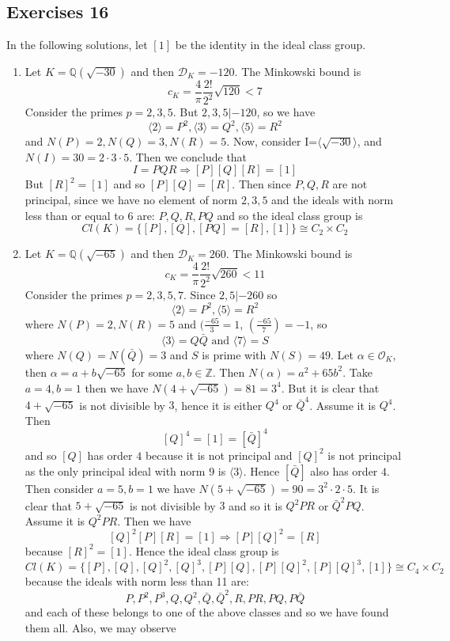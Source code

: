 \subsection{Exercises 16}
In the following solutions, let $[1]$ be the identity in the ideal class group.
\begin{enumerate}
\item Let $K=\mathbb{Q}(\sqrt{-30})$ and then $\mathcal{D}_K=-120$. The Minkowski bound is
$$c_K=\frac{4}{\pi}\frac{2!}{2^2}\sqrt{120}<7$$
Consider the primes $p=2,3,5$.
But $2,3,5|-120$, so we have
$$\langle 2 \rangle=P^2,\langle 3 \rangle=Q^2,\langle 5 \rangle=R^2$$
and $N(P)=2,N(Q)=3,N(R)=5$.
Now, consider I=$\langle \sqrt{-30} \rangle$, and $N(I)=30=2\cdot 3 \cdot5$.
Then we conclude that
$$I=PQR \Rightarrow [P][Q][R]=[1]$$
But $[R]^2=[1]$ and so $[P][Q]=[R]$.
Then since $P,Q,R$ are not principal, since we have no element of norm $2,3,5$ and
the ideals with norm less than or equal to $6$ are:
$P,Q,R,PQ$ and so the ideal class group is
$$Cl(K)=\{[P],[Q],[PQ]=[R],[1]\} \cong C_2 \times C_2$$
\item Let $K=\mathbb{Q}(\sqrt{-65})$ and then $\mathcal{D}_K=260$. The Minkowski bound is
$$c_K=\frac{4}{\pi}\frac{2!}{2^2}\sqrt{260}<11$$
Consider the primes $p=2,3,5,7$.
Since $2,5|-260$ so
$$\langle 2 \rangle=P^2, \langle 5 \rangle=R^2$$
where $N(P)=2,N(R)=5$
and $(\frac{-65}{3}=1$, $(\frac{-65}{7})=-1$, so
$$\langle 3 \rangle= Q\bar{Q} \text{ and } \langle 7 \rangle=S$$
where $N(Q)=N(\bar{Q})=3$ and $S$ is prime with $N(S)=49$.
Let $\alpha \in \mathcal{O}_K$, then $\alpha=a+b\sqrt{-65}$ for some $a,b \in \mathbb{Z}$. Then
$N(\alpha)=a^2+65b^2$. Take $a=4,b=1$ then we have
$N(4+\sqrt{-65})=81=3^4$. But it is clear that $4+\sqrt{-65}$ is not divisible by $3$, hence
it is either $Q^4$ or $\bar{Q}^4$. Assume it is $Q^4$. Then
$$[Q]^4=[1]=[\bar{Q}]^4$$
and so $[Q]$ has order $4$ because it is not principal and $[Q]^2$ is not principal as the only principal
ideal with norm $9$ is $\langle 3 \rangle$. Hence $[\bar{Q}]$ also has order $4$.
Then consider $a=5,b=1$ we have $N(5+\sqrt{-65})=90=3^2 \cdot 2 \cdot 5$. It is clear that
$5+\sqrt{-65}$ is not divisible by $3$ and so it is $Q^2PR$ or $\bar{Q}^2 PQ$. Assume it is
$Q^2PR$. Then we have
$$[Q]^2 [P][R]=[1] \Rightarrow [P][Q]^2=[R]$$
because $[R]^2=[1]$. Hence the ideal class group is
$$Cl(K)=\{[P],[Q],[Q]^2,[Q]^3,[P][Q],[P][Q]^2,[P][Q]^3,[1]\} \cong C_4 \times C_2$$
because the ideals with norm less than 11 are:
$$P,P^2,P^3,Q,Q^2,\bar{Q},\bar{Q}^2,R,PR,PQ,P\bar{Q}$$
and each of these belongs to one of the above classes and so we have found them all. Also, we may observe

\end{enumerate}
